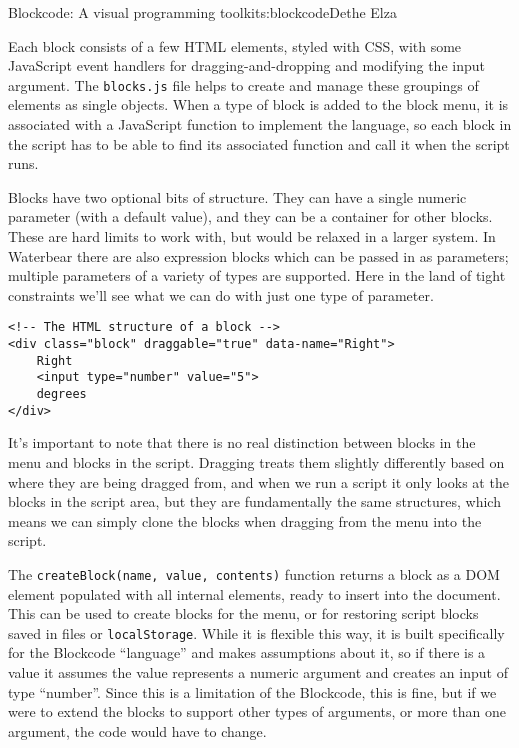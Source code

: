 \begin{aosachapter}{Blockcode: A visual programming toolkit}{s:blockcode}{Dethe Elza}
\label{blocks.js}

Each block consists of a few HTML elements, styled with CSS, with some
JavaScript event handlers for dragging-and-dropping and modifying the
input argument. The \texttt{blocks.js} file helps to create and manage
these groupings of elements as single objects. When a type of block is
added to the block menu, it is associated with a JavaScript function to
implement the language, so each block in the script has to be able to
find its associated function and call it when the script runs.


Blocks have two optional bits of structure. They can have a single
numeric parameter (with a default value), and they can be a container
for other blocks. These are hard limits to work with, but would be
relaxed in a larger system. In Waterbear there are also expression
blocks which can be passed in as parameters; multiple parameters of a
variety of types are supported. Here in the land of tight constraints
we'll see what we can do with just one type of parameter.

\begin{verbatim}
<!-- The HTML structure of a block -->
<div class="block" draggable="true" data-name="Right">
    Right
    <input type="number" value="5">
    degrees
</div>
\end{verbatim}

It's important to note that there is no real distinction between blocks
in the menu and blocks in the script. Dragging treats them slightly
differently based on where they are being dragged from, and when we run
a script it only looks at the blocks in the script area, but they are
fundamentally the same structures, which means we can simply clone the
blocks when dragging from the menu into the script.

The \texttt{createBlock(name, value, contents)} function returns a block
as a DOM element populated with all internal elements, ready to insert
into the document. This can be used to create blocks for the menu, or
for restoring script blocks saved in files or \texttt{localStorage}.
While it is flexible this way, it is built specifically for the
Blockcode ``language'' and makes assumptions about it, so if there is a
value it assumes the value represents a numeric argument and creates an
input of type ``number''. Since this is a limitation of the Blockcode,
this is fine, but if we were to extend the blocks to support other types
of arguments, or more than one argument, the code would have to change.


\end{aosachapter}
